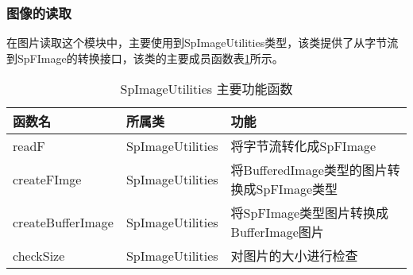 \subsubsection{图像的读取}
在图片读取这个模块中，主要使用到SpImageUtilities类型，该类提供了从字节流到SpFImage的转换接口，该类的主要成员函数表\ref{tab:SpImageUtilities_function}所示。
\begin{table}[h] %
\caption{SpImageUtilities 主要功能函数} %
\centering
\label{tab:SpImageUtilities_function}
\begin{tabular}{p{3cm}|p{3cm}|p{6cm}} %
\hline
\hline
函数名  & 所属类 & 功能 \\ %
\hline %
readF  & SpImageUtilities & 将字节流转化成SpFImage\\
\hline
createFImge  & SpImageUtilities & 将BufferedImage类型的图片转换成SpFImage类型\\
\hline
createBufferImage & SpImageUtilities & 将SpFImage类型图片转换成BufferImage图片\\
\hline
checkSize  & SpImageUtilities & 对图片的大小进行检查\\
\hline
\hline
\end{tabular}
\end{table}

